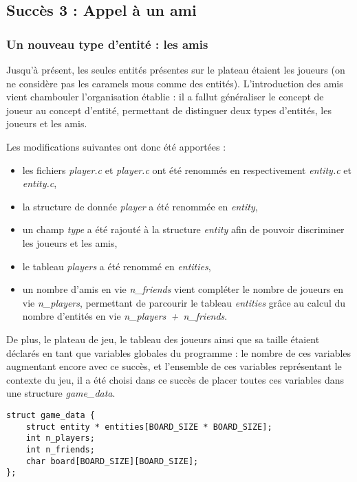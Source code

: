 \documentclass[12pt]{article}
\begin{document}
\subsection{Succès 3 : Appel à un ami}

\subsubsection{Un nouveau type d'entité : les amis}

Jusqu'à présent, les seules entités présentes sur le plateau étaient les joueurs (on ne considère pas les caramels mous comme des entités). L'introduction des amis vient chambouler l'organisation établie : il a fallut généraliser le concept de joueur au concept d'entité, permettant de distinguer deux types d'entités, les joueurs et les amis.

Les modifications suivantes ont donc été apportées :
\begin{itemize}
\item les fichiers \textit{player.c} et \textit{player.c} ont été renommés en respectivement \textit{entity.c} et \textit{entity.c},
\item la structure de donnée \textit{player} a été renommée en \textit{entity},
\item un champ \textit{type} a été rajouté à la structure \textit{entity} afin de pouvoir discriminer les joueurs et les amis,
\item le tableau \textit{players} a été renommé en \textit{entities},
\item un nombre d'amis en vie \textit{n\_friends} vient compléter le nombre de joueurs en vie \textit{n\_players}, permettant de parcourir le tableau \textit{entities} grâce au calcul du nombre d'entités en vie \textit{n\_players~+~n\_friends}.
\end{itemize}

De plus, le plateau de jeu, le tableau des joueurs ainsi que sa taille étaient déclarés en tant que variables globales du programme : le nombre de ces variables augmentant encore avec ce succès, et l'ensemble de ces variables représentant le contexte du jeu, il a été choisi dans ce succès de placer toutes ces variables dans une structure \textit{game\_data}.

\begin{verbatim}
struct game_data {
    struct entity * entities[BOARD_SIZE * BOARD_SIZE];
    int n_players;
    int n_friends;
    char board[BOARD_SIZE][BOARD_SIZE];
};
\end{verbatim}
\end{document}
